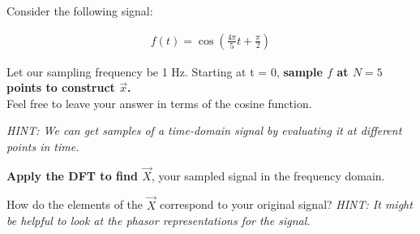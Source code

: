 \begin{enumerate}

\qitem

Consider the following signal:

\begin{align*}
f(t) = \cos(\frac{4\pi}{5}t + \frac{\pi}{2})
\end{align*}

Let our sampling frequency be 1 Hz. Starting at t = 0, {\bf sample $f$ at $N = 5$ points to construct $\vec{x}$. } \\
Feel free to leave your answer in terms of the cosine function.

{\em HINT:
We can get samples of a time-domain signal by evaluating it at different points in time. \\
}


\qitem
{\bf Apply the DFT to find $\vec{X}$}, your sampled signal in the frequency domain.


\qitem
How do the elements of the $\vec{X}$ correspond to your original signal?
{\em HINT:
It might be helpful to look at the phasor representations for the signal.
}


\end{enumerate}
